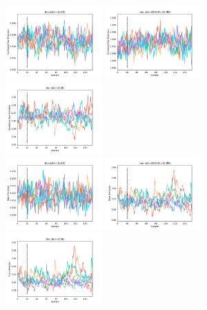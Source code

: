 \documentclass{aa}
\begin{document}
\begin{figure}
  \centering
  \includegraphics[width=0.33\textwidth]{figs/mixing/total_star_trace_3121308_v1.pdf} 
  \includegraphics[width=0.33\textwidth]{figs/mixing/total_star_trace_2429499_v1.pdf}
  \includegraphics[width=0.33\textwidth]{figs/mixing/total_star_trace_1352704_v1.pdf}\\
   \includegraphics[width=0.33\textwidth]{figs/mixing/star_trace_3121308_v1.pdf} 
  \includegraphics[width=0.33\textwidth]{figs/mixing/star_trace_2429499_v1.pdf}
  \includegraphics[width=0.33\textwidth]{figs/mixing/star_trace_1352704_v1.pdf}\\

\end{figure}
\end{document}

